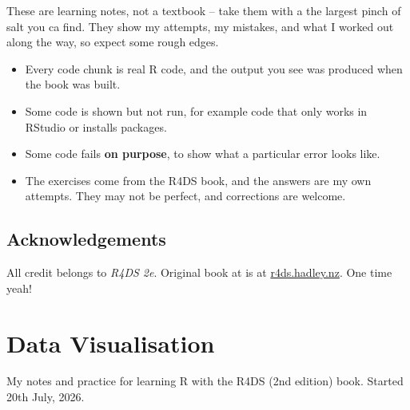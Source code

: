 \documentclass[
  letterpaper,
  DIV=11,
  numbers=noendperiod]{scrreprt}
\providecommand{\tightlist}{%
  \setlength{\itemsep}{0pt}\setlength{\parskip}{0pt}}
\begin{document}

\begin{tcolorbox}[enhanced jigsaw, arc=.35mm, bottomrule=.15mm, bottomtitle=1mm, breakable, colback=white, colbacktitle=quarto-callout-note-color!10!white, colframe=quarto-callout-note-color-frame, coltitle=black, left=2mm, leftrule=.75mm, opacityback=0, opacitybacktitle=0.6, rightrule=.15mm, title=\textcolor{quarto-callout-note-color}{\faInfo}\hspace{0.5em}{Note}, titlerule=0mm, toprule=.15mm, toptitle=1mm]

These are learning notes, not a textbook -- take them with a the largest
pinch of salt you ca find. They show my attempts, my mistakes, and what
I worked out along the way, so expect some rough edges.

\end{tcolorbox}

\begin{itemize}
\tightlist
\item
  Every code chunk is real R code, and the output you see was produced
  when the book was built.
\item
  Some code is shown but not run, for example code that only works in
  RStudio or installs packages.
\item
  Some code fails \textbf{on purpose}, to show what a particular error
  looks like.
\item
  The exercises come from the R4DS book, and the answers are my own
  attempts. They may not be perfect, and corrections are welcome.
\end{itemize}

\section*{Acknowledgements}\label{acknowledgements}


All credit belongs to \emph{R4DS 2e}. Original book at is at
\href{https://r4ds.hadley.nz/}{r4ds.hadley.nz}. One time yeah!


\chapter{Data Visualisation}\label{sec-data-visualisation}

My notes and practice for learning R with the R4DS (2nd edition) book.
Started 20th July, 2026.
\end{document}
